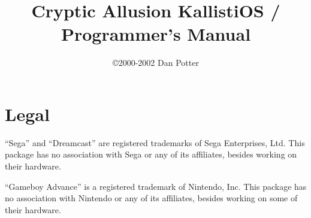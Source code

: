 \documentclass[english]{report}
\begin{document}


\newcommand{\funcname}[1]{%
	\texttt{#1}%
}

\newcommand{\progname}[1]{%
	\textbf{#1}%
}

\newcommand{\dirname}[1]{%
	\textbf{#1}%
}

\newcommand{\paramname}[1]{%
	\textit{#1}%
}

\newcommand{\dtname}[1]{%
	\textit{#1}%
}

\newcommand{\libname}[1]{%
	\textbf{#1}%
}

\newcommand{\code}[1]{%
	\texttt{#1}%
}

\newcommand{\constname}[1]{%
	\texttt{#1}%
}

\newcommand{\tm}[0]{ (tm) }

\newcommand{\kosversion}{ \#\#version\#\# }


\title{Cryptic Allusion KallistiOS / Programmer's Manual}
\author{\copyright 2000-2002 Dan Potter}

\maketitle
\tableofcontents{}


\chapter*{Legal}

``Sega'' and ``Dreamcast'' are registered trademarks of Sega
Enterprises, Ltd. This package has no association with Sega or any
of its affiliates, besides working on their hardware.

``Gameboy Advance'' is a registered trademark of Nintendo, Inc.
This package has no association with Nintendo or any of its affiliates,
besides working on some of their hardware.
\end{document}
